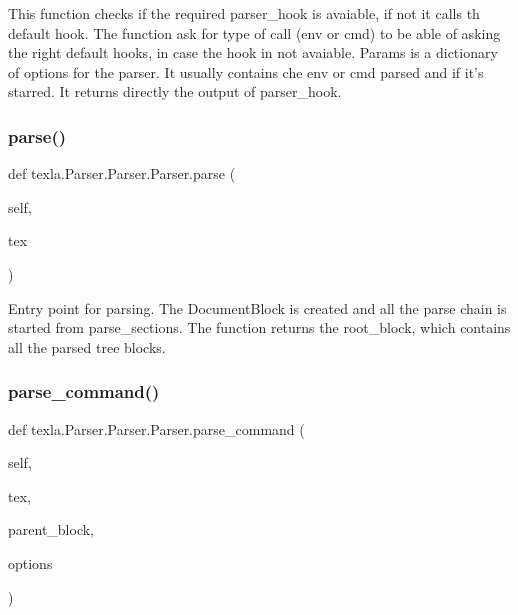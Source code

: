 \begin{DoxyVerb}This function checks if the required parser_hook
is avaiable, if not it calls th default hook.
The function ask for type of call (env or cmd)
to be able of asking the right default hooks,
in case the hook in not avaiable.
Params is a dictionary of options for the parser. It
usually contains che env or cmd parsed and if it's
starred.
It returns directly the output of parser_hook.
\end{DoxyVerb}
 \hypertarget{classtexla_1_1Parser_1_1Parser_1_1Parser_afb55891b1d2f77a2e3aeeeb7f7e63550}{}\label{classtexla_1_1Parser_1_1Parser_1_1Parser_afb55891b1d2f77a2e3aeeeb7f7e63550} 
\subsubsection{\texorpdfstring{parse()}{parse()}}
{\footnotesize\ttfamily def texla.\+Parser.\+Parser.\+Parser.\+parse (\begin{DoxyParamCaption}\item[{}]{self,  }\item[{}]{tex }\end{DoxyParamCaption})}

\begin{DoxyVerb}Entry point for parsing.
The DocumentBlock is created and all the
parse chain is started from parse_sections.
The function returns the root_block,
which contains all the parsed tree blocks.\end{DoxyVerb}
 \hypertarget{classtexla_1_1Parser_1_1Parser_1_1Parser_ac878c2e3e4690f9975ccf541b11796b5}{}\label{classtexla_1_1Parser_1_1Parser_1_1Parser_ac878c2e3e4690f9975ccf541b11796b5} 
\subsubsection{\texorpdfstring{parse\+\_\+command()}{parse\_command()}}
{\footnotesize\ttfamily def texla.\+Parser.\+Parser.\+Parser.\+parse\+\_\+command (\begin{DoxyParamCaption}\item[{}]{self,  }\item[{}]{tex,  }\item[{}]{parent\+\_\+block,  }\item[{}]{options }\end{DoxyParamCaption})}

